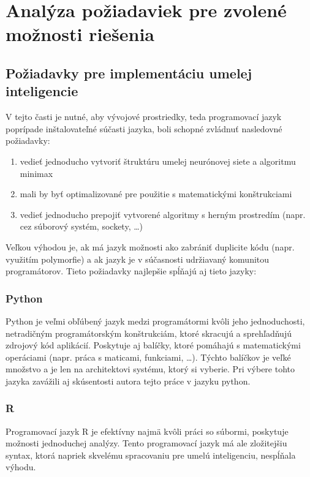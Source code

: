 \section{Analýza požiadaviek pre zvolené možnosti riešenia}\label{sec:requirements}

\subsection{Požiadavky pre implementáciu umelej inteligencie}\label{subsec:requirements-ai}

V tejto časti je nutné, aby vývojové prostriedky, teda programovací jazyk poprípade inštalovateľné súčasti jazyka, boli
schopné zvládnuť nasledovné požiadavky:
\begin{enumerate}
    \item vedieť jednoducho vytvoriť štruktúru umelej neurónovej siete a algoritmu minimax
    \item mali by byť optimalizované pre použitie s matematickými konštrukciami
    \item vedieť jednoducho prepojiť vytvorené algoritmy s herným prostredím (napr. cez súborový systém, sockety, \ldots)
\end{enumerate}
Veľkou výhodou je, ak má jazyk možnosti ako zabrániť duplicite kódu (napr. využitím polymorfie) a ak jazyk je v
súčasnosti udržiavaný komunitou programátorov.
Tieto požiadavky najlepšie spĺňajú\cite{best_ai_languages} aj tieto jazyky:

\subsubsection{Python}
Python je veľmi obľúbený jazyk medzi programátormi kvôli jeho jednoduchosti, netradičným programátorským
konštrukciám, ktoré skracujú a sprehľadňujú zdrojový kód aplikácií.
Poskytuje aj balíčky, ktoré pomáhajú s matematickými operáciami (napr. práca s maticami, funkciami, \dots).
Týchto balíčkov je veľké množstvo a je len na architektovi systému, ktorý si vyberie.
Pri výbere tohto jazyka zavážili aj skúsentosti autora tejto práce v jazyku python.

\subsubsection{R}

Programovací jazyk R je efektívny najmä kvôli práci so súbormi, poskytuje možnosti jednoduchej analýzy.
Tento programovací jazyk má ale zložitejšiu syntax, ktorá napriek skvelému spracovaniu pre umelú inteligenciu,
nespĺňala výhodu.

